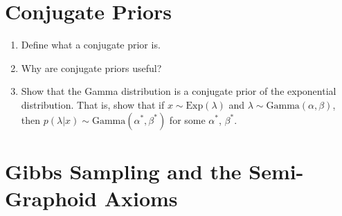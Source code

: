 \documentclass[11pt]{article}
\begin{document}
\section{Conjugate Priors}
\begin{enumerate}
\item Define what a conjugate prior is.\\
\begin{answertext}{3cm}{}  


\end{answertext} 

\item Why are conjugate priors useful? \\
\begin{answertext}{3cm}{}


\end{answertext} 

\item Show that the Gamma distribution is a conjugate prior of the exponential distribution. That is, show that if $x \sim \text{Exp}(\lambda)$ and $\lambda \sim \text{Gamma}(\alpha, \beta)$, then $p(\lambda | x) \sim \text{Gamma}(\alpha^*, \beta^*)$ for some $\alpha^*$, $\beta^*$. \\
\begin{answertext}{6cm}{}


\end{answertext} 
\end{enumerate}

\pagebreak
\section{Gibbs Sampling and the Semi-Graphoid Axioms}
\end{document}
